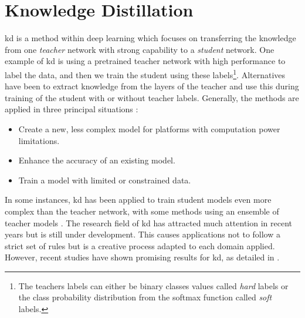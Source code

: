 \section{Knowledge Distillation} \label{knowledge distillation}
    \gls{kd} is a method within deep learning which focuses on transferring the knowledge from one \textit{teacher} network with strong capability to a \textit{student} network. One example of \gls{kd} is using a pretrained teacher network with high performance to label the data, and then we train the student using these labels\footnote{The teachers labels can either be binary classes values called \textit{hard} labels or the class probability distribution from the softmax function called \textit{soft} labels.}. Alternatives have been to extract knowledge from the layers of the teacher and use this during training of the student with or without teacher labels. Generally, the methods are applied in three principal situations \cite{abbasi2020modeling}:
    \begin{itemize}
        \item Create a new, less complex model for platforms with computation power limitations.
        \item Enhance the accuracy of an existing model.
        \item Train a model with limited or constrained data.
    \end{itemize}
    
    In some instances, \gls{kd} has been applied to train student models even more complex than the teacher network, with some methods using an ensemble of teacher models \cite{abbasi2020modeling}. The research field of \gls{kd} has attracted much attention in recent years but is still under development. This causes applications not to follow a strict set of rules but is a creative process adapted to each domain applied. However, recent studies have shown promising results for \gls{kd}, as detailed in  \citet{alkhulaifi2021knowledge}.
  
    
    
    
    


    




